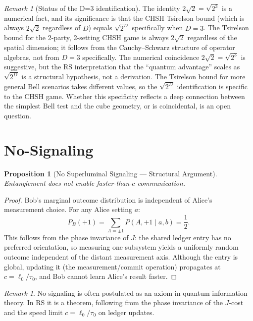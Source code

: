 \documentclass[12pt,a4paper]{article}
\newtheorem{proposition}[theorem]{Proposition}
\theoremstyle{definition}
\theoremstyle{remark}
\newtheorem{remark}[theorem]{Remark}
\begin{document}
\begin{remark}[Status of the D=3 identification]\label{rem:d3status}
The identity $2\sqrt{2} = \sqrt{2^3}$ is a numerical fact, and its
significance is that the CHSH Tsirelson bound (which is always
$2\sqrt{2}$ regardless of $D$) equals $\sqrt{2^D}$ specifically when
$D = 3$.  The Tsirelson bound for the 2-party, 2-setting CHSH game is always
$2\sqrt{2}$ regardless of the spatial dimension; it follows from the
Cauchy--Schwarz structure of operator algebras, not from $D = 3$
specifically.  The numerical coincidence $2\sqrt{2} = \sqrt{2^3}$ is
suggestive, but the RS interpretation that the ``quantum advantage''
scales as $\sqrt{2^D}$ is a structural hypothesis, not a derivation.
The Tsirelson bound for more general Bell scenarios takes different
values, so the $\sqrt{2^D}$ identification is specific to the CHSH
game.  Whether this specificity reflects a deep connection between
the simplest Bell test and the cube geometry, or is coincidental,
is an open question.
\end{remark}

\section{No-Signaling}
\label{sec:no-signaling}

\begin{proposition}[No Superluminal Signaling --- Structural Argument]
\label{thm:nosignal}
Entanglement does not enable faster-than-$c$ communication.
\end{proposition}

\begin{proof}
Bob's marginal outcome distribution is independent of Alice's
measurement choice.  For any Alice setting $a$:
\begin{equation}
  P_B(+1) = \sum_{A=\pm 1} P(A, +1 \mid a, b) = \frac{1}{2}.
\end{equation}
This follows from the phase invariance of $J$: the shared
ledger entry has no preferred orientation, so measuring one
subsystem yields a uniformly random outcome independent of the
distant measurement axis.  Although the entry is global,
updating it (the measurement/commit operation) propagates at
$c = \ell_0/\tau_0$, and Bob cannot learn Alice's result
faster.
\end{proof}

\begin{remark}
No-signaling is often postulated as an axiom in quantum
information theory.  In RS it is a theorem, following from the
phase invariance of the $J$-cost and the speed limit
$c = \ell_0/\tau_0$ on ledger updates.
\end{remark}
\end{document}
